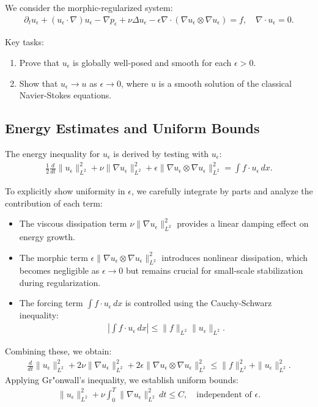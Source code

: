 \documentclass[12pt]{article}
\begin{document}
We consider the morphic-regularized system:
\begin{align}
\partial_t u_\epsilon + (u_\epsilon \cdot \nabla) u_\epsilon - \nabla p_\epsilon + \nu \Delta u_\epsilon - \epsilon \nabla \cdot (\nabla u_\epsilon \otimes \nabla u_\epsilon) = f, \quad \nabla \cdot u_\epsilon = 0.
\end{align}

Key tasks:
\begin{enumerate}
    \item Prove that $u_\epsilon$ is globally well-posed and smooth for each $\epsilon > 0$.
    \item Show that $u_\epsilon \to u$ as $\epsilon \to 0$, where $u$ is a smooth solution of the classical Navier-Stokes equations.
\end{enumerate}

\subsection{Energy Estimates and Uniform Bounds}

The energy inequality for $u_\epsilon$ is derived by testing with $u_\epsilon$:
\begin{align}
\frac{1}{2} \frac{d}{dt} \| u_\epsilon \|_{L^2}^2 + \nu \| \nabla u_\epsilon \|_{L^2}^2 + \epsilon \| \nabla u_\epsilon \otimes \nabla u_\epsilon \|_{L^2}^2 = \int f \cdot u_\epsilon \, dx.
\end{align}

To explicitly show uniformity in $\epsilon$, we carefully integrate by parts and analyze the contribution of each term:
\begin{itemize}
    \item The viscous dissipation term $\nu \| \nabla u_\epsilon \|_{L^2}^2$ provides a linear damping effect on energy growth.
    \item The morphic term $\epsilon \| \nabla u_\epsilon \otimes \nabla u_\epsilon \|_{L^2}^2$ introduces nonlinear dissipation, which becomes negligible as $\epsilon \to 0$ but remains crucial for small-scale stabilization during regularization.
    \item The forcing term $\int f \cdot u_\epsilon \, dx$ is controlled using the Cauchy-Schwarz inequality:
    \begin{align}
    \left| \int f \cdot u_\epsilon \, dx \right| \leq \| f \|_{L^2} \| u_\epsilon \|_{L^2}.
    \end{align}
\end{itemize}
Combining these, we obtain:
\begin{align}
\frac{d}{dt} \| u_\epsilon \|_{L^2}^2 + 2 \nu \| \nabla u_\epsilon \|_{L^2}^2 + 2 \epsilon \| \nabla u_\epsilon \otimes \nabla u_\epsilon \|_{L^2}^2 \leq \| f \|_{L^2}^2 + \| u_\epsilon \|_{L^2}^2.
\end{align}
Applying Gr"onwall's inequality, we establish uniform bounds:
\begin{align}
\| u_\epsilon \|_{L^2}^2 + \nu \int_0^T \| \nabla u_\epsilon \|_{L^2}^2 \, dt \leq C, \quad \text{independent of } \epsilon.
\end{align}
\end{document}
